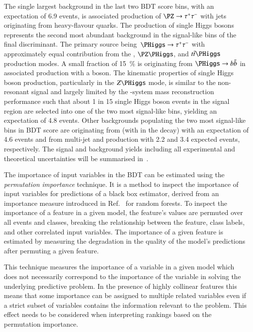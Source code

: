 The single largest background in the last two BDT score bins, with an
expectation of 6.9 events, is associated production of
$\PZ \rightarrow \tautau$ with jets originating from heavy-flavour
quarks. The production of single Higgs bosons represents the second
most abundant background in the signal-like bins of the final
discriminant. The primary source being~$\PHiggs \rightarrow \tautau$
with approximately equal contribution from the \ggF, $\PZ\PHiggs$, and
$\ttbar\PHiggs$ production modes. A small fraction of
\SI{15}{\percent} is originating from $\PHiggs \rightarrow \bbbar$ in
associated production with a \PZ boson. The kinematic properties of
single Higgs boson production, particularly in the $Z\PHiggs$ mode, is
similar to the non-resonant \HH signal and largely limited by the
\PHiggs-system mass reconstruction performance such that about 1 in 15
single Higgs boson events in the signal region are selected into one
of the two most signal-like bins, yielding an expectation of 4.8
events. Other backgrounds populating the two most signal-like bins in
BDT score are originating from \ttbar (with \truetauhadvis in the
decay) with an expectation of 4.6 events and \jettotauhadvis from
multi-jet and \ttbar production with 2.2 and 3.4 expected events,
respectively. The signal and background yields including all
experimental and theoretical uncertainties will be summarised
in~.

The importance of input variables in the BDT can be estimated using
the \emph{permutation importance} technique. It is a method to inspect
the importance of input variables for predictions of a black box
estimator, derived from an importance measure introduced in
Ref.~\cite{breiman01} for random forests. To inspect the importance of
a feature in a given model, the feature's values are permuted over all
events and classes, breaking the relationship between the feature,
class labels, and other correlated input variables. The importance of
a given feature is estimated by measuring the degradation in the
quality of the model's predictions after permuting a given feature.

This technique measures the importance of a variable in a given model
which does not necessarily correspond to the importance of the
variable in solving the underlying predictive problem. In the presence
of highly collinear features this means that some importance can be
assigned to multiple related variables even if a strict subset of
variables contains the information relevant to the problem. This
effect needs to be considered when interpreting rankings based on the
permutation importance.


